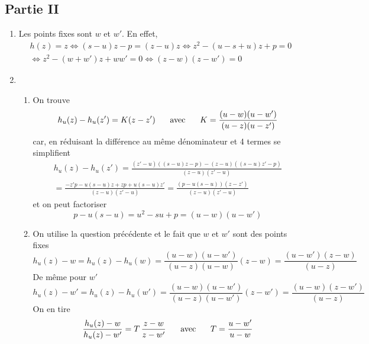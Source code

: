 \subsection*{Partie II}
\begin{enumerate}
  \item Les points fixes sont $w$ et $w'$. En effet,
\begin{multline*}
h(z)=z
\Leftrightarrow (s-u)z -p =(z-u)z
\Leftrightarrow z^2 -(u -s +u)z + p =0 \\
\Leftrightarrow z^2 - (w+w')z +ww' = 0 
\Leftrightarrow (z-w)(z-w')=0
\end{multline*}

\item 
\begin{enumerate}
  \item On trouve
\begin{displaymath}
h_u(z)-h_u(z') = K(z-z') \hspace{0.5cm}\text{ avec }\hspace{0.5cm}  K = \frac{(u-w)(u-w')}{(u-z)(u-z')}
\end{displaymath}
car, en réduisant la différence au même dénominateur et 4 termes se simplifient
\begin{multline*}
h_u(z)-h_u(z')
=\frac{\left( z'-u\right)\left( (s-u)z-p\right) - \left( z-u\right)\left( (s-u)z'-p\right) }{(z-u)(z'-u)} \\
= \frac{-z'p - u(s-u)z + zp + u(s-u)z' }{(z-u)(z'-u)}
= \frac{(p-u(s-u))(z-z') }{(z-u)(z'-u)}
\end{multline*}
et on peut factoriser
\begin{displaymath}
  p-u(s-u) = u^2 -su + p = (u -w)(u-w')
\end{displaymath}

  \item On utilise la question précédente et le fait que $w$ et $w'$ sont des points fixes
\begin{displaymath}
h_u(z)-w = h_u(z) - h_u(w) = \frac{(u-w)(u-w')}{(u-z)(u-w)}(z-w) = \frac{(u-w')(z-w)}{(u-z)}  
\end{displaymath}
De même pour $w'$
\begin{displaymath}
h_u(z)-w' = h_u(z) - h_u(w') = \frac{(u-w)(u-w')}{(u-z)(u-w')}(z-w') = \frac{(u-w)(z-w')}{(u-z)}   
\end{displaymath}
On en tire
\begin{displaymath}
  \frac{h_u(z)-w}{h_u(z)-w'} = T\, \frac{z-w}{z-w'} \hspace{0.5cm}\text{ avec }\hspace{0.5cm} T=\frac{u-w'}{u-w}
\end{displaymath}
\end{enumerate}


\end{enumerate}
